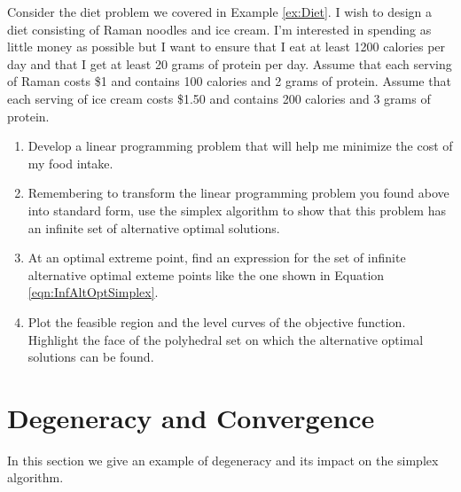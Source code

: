 \begin{exercise} Consider the diet problem we covered in Example \ref{ex:Diet}. I wish to design a diet consisting of Raman noodles and ice cream. I'm interested in spending as little money as possible but I want to ensure that I eat at least 1200 calories per day and that I get at least 20 grams of protein per day. Assume that each serving of Raman costs \$1 and contains 100 calories and 2 grams of protein. Assume that each serving of ice cream costs \$1.50 and contains 200 calories and 3 grams of protein. 
\begin{enumerate}
\item Develop a linear programming problem that will help me minimize the cost of my food intake. 
\item Remembering to transform the linear programming problem you found above into standard form, use the simplex algorithm to show that this problem has an infinite set of alternative optimal solutions. 
\item At an optimal extreme point, find an expression for the set of infinite alternative optimal exteme points like the one shown in Equation \ref{eqn:InfAltOptSimplex}. 
\item Plot the feasible region and the level curves of the objective function. Highlight the face of the polyhedral set on which the alternative optimal solutions can be found.
\end{enumerate}

\end{exercise}

\section{Degeneracy and Convergence}
In this section we give an example of degeneracy and its impact on the simplex algorithm. 

